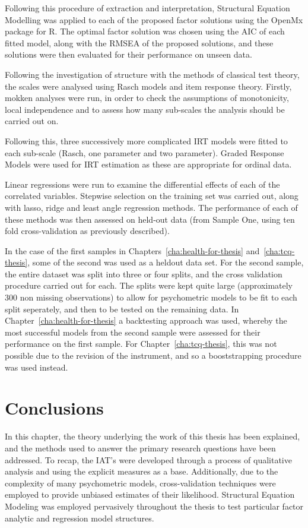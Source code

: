 Following this procedure of extraction and interpretation, Structural Equation Modelling was applied to each of the proposed factor solutions using the OpenMx package for R. The optimal factor solution was chosen using the AIC of each fitted model, along with the RMSEA of the proposed solutions, and these solutions were then evaluated for their performance on unseen data. 


Following the investigation of structure with the methods of classical test theory, the scales were analysed using Rasch models and item response theory. Firstly, mokken analyses were run, in order to check the assumptions of monotonicity, local independence and to assess how many sub-scales the analysis should be carried out on. 

Following this, three successively more complicated IRT models were fitted to each sub-scale (Rasch, one parameter and two parameter). Graded Response Models were used for IRT estimation as these are appropriate for ordinal data. 


Linear regressions were run to examine the differential effects of each of the correlated variables. Stepwise selection on the training set was carried out, along with lasso, ridge and least angle regression methods. The performance of each of these methods was then assessed on held-out data (from Sample One, using ten fold cross-validation as previously described). 

In the case of the first samples in Chapters~\ref{cha:health-for-thesis} and~\ref{cha:tcq-thesis}, some of the second was used as a heldout data set. For the second sample, the entire dataset was split into three or four splits, and the cross validation procedure carried out for each. The splits were kept quite large (approximately 300 non missing observations) to allow for psychometric models to be fit to each split seperately, and then to be tested on the remaining data. In Chapter~\ref{cha:health-for-thesis} a backtesting approach was used, whereby the most successful models from the second sample were assessed for their performance on the first sample. For Chapter~\ref{cha:tcq-thesis}, this was not possible due to the revision of the instrument, and so a booststrapping procedure was used instead.


\section{Conclusions}
\label{sec:conclusions}


In this chapter, the theory underlying the work of this thesis has been explained, and the methods used to answer the primary research questions have been addressed. To recap, the IAT's were developed through a process of qualitative analysis and using the explicit measures as a base. Additionally, due to the complexity of many psychometric models, cross-validation techniques were employed to provide unbiased estimates of their likelihood. %
Structural Equation Modeling was employed pervasively throughout the thesis to test particular factor analytic and regression model structures.



